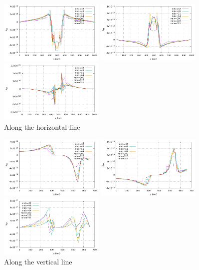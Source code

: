 \begin{center}
\includegraphics[width=5cm]{python_codes/fieldstone_slab_detachment1/images/horizontal_exx.pdf}
\includegraphics[width=5cm]{python_codes/fieldstone_slab_detachment1/images/horizontal_eyy.pdf}
\includegraphics[width=5cm]{python_codes/fieldstone_slab_detachment1/images/horizontal_exy.pdf}\\
Along the horizontal line
\end{center}

\begin{center}
\includegraphics[width=5cm]{python_codes/fieldstone_slab_detachment1/images/vertical_exx.pdf}
\includegraphics[width=5cm]{python_codes/fieldstone_slab_detachment1/images/vertical_eyy.pdf}
\includegraphics[width=5cm]{python_codes/fieldstone_slab_detachment1/images/vertical_exy.pdf}\\
Along the vertical line
\end{center}



